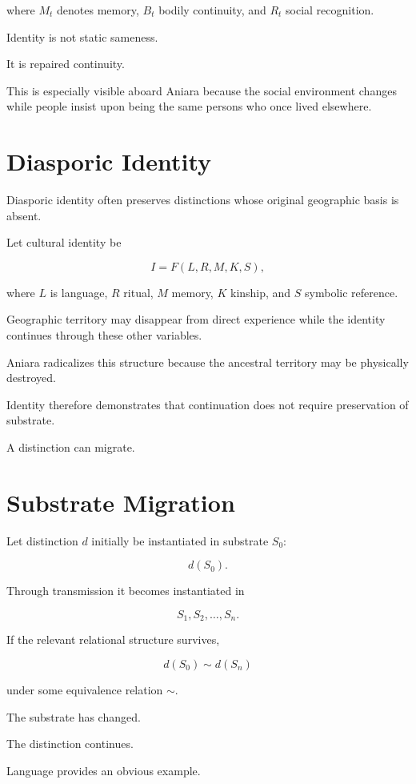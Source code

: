 \documentclass[11pt,oneside]{book}
\theoremstyle{definition}
\theoremstyle{remark}
\begin{document}
where \(M_t\) denotes memory, \(B_t\) bodily continuity, and \(R_t\) social recognition.

Identity is not static sameness.

It is repaired continuity.

This is especially visible aboard Aniara because the social environment changes while people insist upon being the same persons who once lived elsewhere.

\section{Diasporic Identity}

Diasporic identity often preserves distinctions whose original geographic basis is absent.

Let cultural identity be

\[
I
=
F(L,R,M,K,S),
\]

where \(L\) is language, \(R\) ritual, \(M\) memory, \(K\) kinship, and \(S\) symbolic reference.

Geographic territory may disappear from direct experience while the identity continues through these other variables.

Aniara radicalizes this structure because the ancestral territory may be physically destroyed.

Identity therefore demonstrates that continuation does not require preservation of substrate.

A distinction can migrate.

\section{Substrate Migration}

Let distinction \(d\) initially be instantiated in substrate \(S_0\):

\[
d(S_0).
\]

Through transmission it becomes instantiated in

\[
S_1,S_2,\ldots,S_n.
\]

If the relevant relational structure survives,

\[
d(S_0)
\sim
d(S_n)
\]

under some equivalence relation \(\sim\).

The substrate has changed.

The distinction continues.

Language provides an obvious example.
\end{document}
